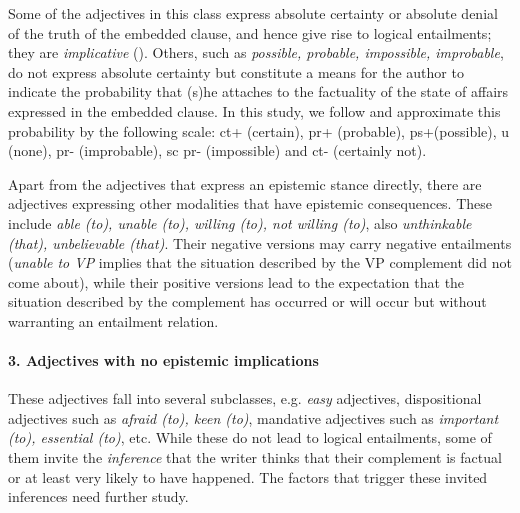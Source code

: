 \documentclass[10pt]{article}
\begin{document}
Some of the adjectives in this class express absolute certainty or absolute denial of the truth of the embedded clause, and hence give rise to logical entailments; they are \textit{implicative} (\cite{karttunen:1971}). Others, such as \textit{possible, probable, impossible, improbable}, do not express absolute certainty but constitute a means for the author  to indicate the probability that (s)he attaches to the factuality of the state of affairs expressed in the embedded clause. In this study, we follow \cite{sauri:2008phd} and approximate this probability by the following scale: {\sc ct}+ (certain), {\sc pr}+ (probable), {\sc ps}+(possible), {\sc u} (none), {\sc pr}- (improbable), {sc pr}- (impossible) and {\sc ct}- (certainly not).

Apart from the adjectives that express an epistemic stance directly, there are adjectives expressing other modalities that have epistemic consequences. These include \textit{able (to), unable (to), willing (to), not willing (to)}, also \textit{unthinkable (that), unbelievable (that)}. Their negative versions may carry negative entailments (\textit{unable to VP} implies that the situation 
described  by the VP complement did not come about), while their positive versions lead to the expectation that the situation described by the complement has occurred or will occur but without warranting an entailment relation.

\vspace{-1.0em}
\paragraph{3. Adjectives with no epistemic implications}
These adjectives fall into several subclasses, e.g. \textit{easy} adjectives, dispositional adjectives such as \textit{afraid (to), keen (to)}, mandative adjectives such as \textit{important (to), essential (to)}, etc. While these do not lead to logical entailments, some of them invite the \textit{inference} that the writer thinks that their complement is factual or at least very likely to have happened. The factors that trigger these invited inferences need further study.
\end{document}

